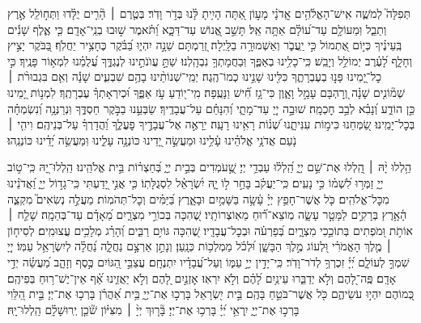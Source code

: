 \begin{narrow}
	
	
	תְּפִלָּה֮ לְמֹשֶׁ֢ה אִֽישׁ־הָאֱלֹ֫הִ֥ים
	אֲֽדֹנָ֗י מָע֣וֹן אַ֭תָּה הָיִ֥יתָ לָּ֗נוּ בְּדֹ֣ר וָדֹֽר׃
	בְּטֶ֤רֶם ׀ הָ֘רִ֤ים יֻלָּ֗דוּ וַתְּח֣וֹלֵֽל אֶ֣רֶץ וְתֵבֵ֑ל וּֽמֵעוֹלָ֥ם עַד־ע֝וֹלָ֗ם אַתָּ֥ה אֵֽל׃
	תָּשֵׁ֣ב אֱ֭נוֹשׁ עַד־דַּכָּ֑א וַ֝תֹּ֗אמֶר שׁ֣וּבוּ בְנֵֽי־אָדָֽם׃
	כִּ֤י אֶ֪לֶף שָׁנִ֡ים בְּֽעֵינֶ֗יךָ כְּי֣וֹם אֶ֭תְמוֹל כִּ֣י יַֽעֲבֹ֑ר וְאַשְׁמוּרָ֥ה בַלָּֽיְלָה׃
	זְ֭רַמְתָּם שֵׁנָ֣ה יִהְי֑וּ בַּ֝בֹּ֗קֶר כֶּחָצִ֥יר יַחֲלֹֽף׃
	בַּ֭בֹּקֶר יָצִ֣יץ וְחָלָ֑ף לָ֝עֶ֗רֶב יְמוֹלֵ֥ל וְיָבֵֽשׁ׃
	כִּֽי־כָלִ֥ינוּ בְאַפֶּ֑ךָ וּֽבַחֲמָתְךָ֥ נִבְהָֽלְנוּ׃
	שַׁתָּ֣ עֲוֺנֹתֵ֣ינוּ לְנֶגְדֶּ֑ךָ עֲ֝לֻמֵ֗נוּ לִמְא֥וֹר פָּנֶֽיךָ׃
	כִּ֣י כׇל־יָ֭מֵינוּ פָּנ֣וּ בְעֶבְרָתֶ֑ךָ כִּלִּ֖ינוּ שָׁנֵ֣ינוּ כְמוֹ־הֶֽגֶה׃
	יְמֵֽי־שְׁנוֹתֵ֨ינוּ בָהֶ֥ם שִׁבְעִ֪ים שָׁנָ֡ה וְאִ֤ם בִּגְבוּרֹ֨ת ׀ שְׁמ֘וֹנִ֤ים שָׁנָ֗ה וְ֭רׇהְבָּם עָמָ֣ל וָאָ֑וֶן כִּי־גָ֥ז חִ֗֝ישׁ וַנָּעֻֽפָה׃
	מִֽי־י֭וֹדֵעַ עֹ֣ז אַפֶּ֑ךָ וּ֝כְיִרְאָתְךָ֗ עֶבְרָתֶֽךָ׃
	לִמְנ֣וֹת יָ֭מֵינוּ כֵּ֣ן הוֹדַ֑ע וְ֝נָבִ֗א לְבַ֣ב חׇכְמָֽה׃
	שׁוּבָ֣ה יְיָ֭ עַד־מָתָ֑י וְ֝הִנָּחֵ֗ם עַל־עֲבָדֶֽיךָ׃
	שַׂבְּעֵ֣נוּ בַבֹּ֣קֶר חַסְדֶּ֑ךָ וּֽנְרַנְּנָ֥ה וְ֝נִשְׂמְחָ֗ה בְּכׇל־יָמֵֽינוּ׃
	שַׂ֭מְּחֵנוּ כִּימ֣וֹת עִנִּיתָ֑נוּ שְׁ֝נ֗וֹת רָאִ֥ינוּ רָעָֽה׃
	יֵרָאֶ֣ה אֶל־עֲבָדֶ֣יךָ פׇעֳלֶ֑ךָ וַ֝הֲדָרְךָ֗ עַל־בְּנֵיהֶֽם׃
	וִיהִ֤י ׀ נֹ֤עַם אֲדֹנָ֥י אֱלֹהֵ֗ינוּ עָ֫לֵ֥ינוּ וּמַעֲשֵׂ֣ה יָ֭דֵינוּ כּוֹנְנָ֥ה עָלֵ֑ינוּ וּֽמַעֲשֵׂ֥ה יָ֝דֵ֗ינוּ כּוֹנְנֵֽהוּ׃
	
	\tzadialeph
	
	הַ֥לְלוּ יָ֨הּ ׀
	הַֽ֭לְלוּ אֶת־שֵׁ֣ם יְיָ֑ הַֽ֝לְל֗וּ עַבְדֵ֥י יְיָ׃
	שֶׁ֣֭עֹמְדִים בְּבֵ֣ית יְיָ֑ בְּ֝חַצְר֗וֹת בֵּ֣ית אֱלֹהֵֽינוּ׃
	הַֽלְלוּ־יָ֭הּ כִּֽי־ט֣וֹב יְיָ֑ זַמְּר֥וּ לִ֝שְׁמ֗וֹ כִּ֣י נָעִֽים׃
	כִּֽי־יַעֲקֹ֗ב בָּחַ֣ר ל֣וֹ יָ֑הּ יִ֝שְׂרָאֵ֗ל לִסְגֻלָּתֽוֹ׃
	כִּ֤י אֲנִ֣י יָ֭דַעְתִּי כִּֽי־גָד֣וֹל יְיָ֑ וַ֝אֲדֹנֵ֗ינוּ מִכׇּל־אֱלֹהִֽים׃
	כֹּ֤ל אֲשֶׁר־חָפֵ֥ץ יְיָ֗ עָ֫שָׂ֥ה בַּשָּׁמַ֥יִם וּבָאָ֑רֶץ בַּ֝יַּמִּ֗ים וְכׇל־תְּהֹמֽוֹת׃
	מַעֲלֶ֣ה נְשִׂאִים֮ מִקְצֵ֢ה הָ֫אָ֥רֶץ בְּרָקִ֣ים לַמָּטָ֣ר עָשָׂ֑ה מֽוֹצֵא־ר֗֝וּחַ מֵאֽוֹצְרוֹתָֽיו׃
	שֶׁ֭הִכָּה בְּכוֹרֵ֣י מִצְרָ֑יִם מֵ֝אָדָ֗ם עַד־בְּהֵמָֽה׃
	שָׁלַ֤ח ׀ אוֹתֹ֣ת וּ֭מֹפְתִים בְּתוֹכֵ֣כִי מִצְרָ֑יִם בְּ֝פַרְעֹ֗ה וּבְכׇל־עֲבָדָֽיו׃
	שֶׁ֭הִכָּה גּוֹיִ֣ם רַבִּ֑ים וְ֝הָרַ֗ג מְלָכִ֥ים עֲצוּמִֽים׃
	לְסִיח֤וֹן ׀ מֶ֤לֶךְ הָאֱמֹרִ֗י וּ֭לְעוֹג מֶ֣לֶךְ הַבָּשָׁ֑ן וּ֝לְכֹ֗ל מַמְלְכ֥וֹת כְּנָֽעַן׃
	וְנָתַ֣ן אַרְצָ֣ם נַחֲלָ֑ה נַ֝חֲלָ֗ה לְיִשְׂרָאֵ֥ל עַמּֽוֹ׃
	יְיָ֭ שִׁמְךָ֣ לְעוֹלָ֑ם יְ֝יָ֗ זִכְרְךָ֥ לְדֹר־וָדֹֽר׃
	כִּֽי־יָדִ֣ין יְיָ֣ עַמּ֑וֹ וְעַל־עֲ֝בָדָ֗יו יִתְנֶחָֽם׃
	עֲצַבֵּ֣י הַ֭גּוֹיִם כֶּ֣סֶף וְזָהָ֑ב מַ֝עֲשֵׂ֗ה יְדֵ֣י אָדָֽם׃
	פֶּֽה־לָ֭הֶם וְלֹ֣א יְדַבֵּ֑רוּ עֵינַ֥יִם לָ֝הֶ֗ם וְלֹ֣א יִרְאֽוּ׃
	אׇזְנַ֣יִם לָ֭הֶם וְלֹ֣א יַאֲזִ֑ינוּ אַ֗֝ף אֵין־יֶשׁ־ר֥וּחַ בְּפִיהֶֽם׃
	כְּ֭מוֹהֶם יִהְי֣וּ עֹשֵׂיהֶ֑ם כֹּ֖ל אֲשֶׁר־בֹּטֵ֣חַ בָּהֶֽם׃
	בֵּ֣ית יִ֭שְׂרָאֵל בָּרְכ֣וּ אֶת־יְיָ֑ בֵּ֥ית אַ֝הֲרֹ֗ן בָּרְכ֥וּ אֶת־יְיָ׃
	בֵּ֣ית הַ֭לֵּוִי בָּרְכ֣וּ אֶת־יְיָ֑ יִֽרְאֵ֥י יְ֝יָ֗ בָּרְכ֥וּ אֶת־יְיָ׃
	בָּ֘ר֤וּךְ יְיָ֨ ׀ מִצִּיּ֗וֹן שֹׁ֘כֵ֤ן יְֽרוּשָׁלָ֗‍ִם הַֽלְלוּ־יָֽהּ׃
	

\end{narrow}
